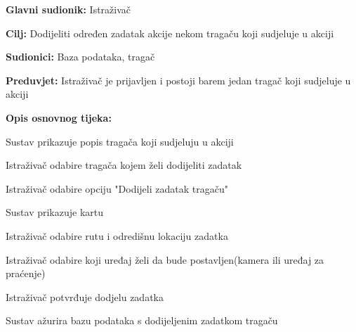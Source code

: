 					\noindent {}
					\begin{packed_item}
						
						\item \textbf{Glavni sudionik:} Istraživač
						\item \textbf{Cilj:} Dodijeliti određen zadatak akcije nekom tragaču koji sudjeluje u akciji
						\item \textbf{Sudionici:} Baza podataka, tragač
						\item \textbf{Preduvjet:} Istraživač je prijavljen i postoji barem jedan tragač koji sudjeluje u akciji
						\item \textbf{Opis osnovnog tijeka:}
						
						\item[] \begin{packed_enum}
							
							\item Sustav prikazuje popis tragača koji sudjeluju u akciji
							\item Istraživač odabire tragača kojem želi dodijeliti zadatak
							\item Istraživač odabire opciju "Dodijeli zadatak tragaču" 
							\item Sustav prikazuje kartu
							\item Istraživač odabire rutu i odredišnu lokaciju zadatka
							\item Istraživač odabire koji uređaj želi da bude postavljen(kamera ili uređaj za praćenje) 
							\item Istraživač potvrđuje dodjelu zadatka 
							\item Sustav ažurira bazu podataka s dodijeljenim zadatkom tragaču 				
						\end{packed_enum}
					\end{packed_item}
					
					\eject
					
